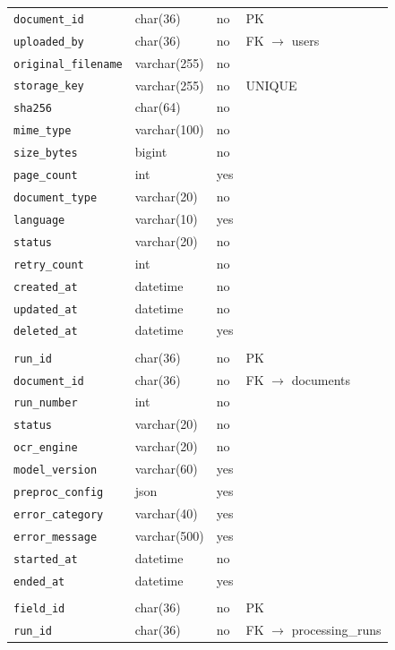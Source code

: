 \documentclass[11pt,a4paper]{report}
\begin{document}
{\begin{longtable}{L{4.2cm}L{3.4cm}L{1.1cm}L{5.0cm}}
\texttt{document\_id} & char(36) & no & PK\\
\texttt{uploaded\_by} & char(36) & no & FK $\rightarrow$ users\\
\texttt{original\_filename} & varchar(255) & no & \\
\texttt{storage\_key} & varchar(255) & no & UNIQUE\\
\texttt{sha256} & char(64) & no & \\
\texttt{mime\_type} & varchar(100) & no & \\
\texttt{size\_bytes} & bigint & no & \\
\texttt{page\_count} & int & yes & \\
\texttt{document\_type} & varchar(20) & no & \\
\texttt{language} & varchar(10) & yes & \\
\texttt{status} & varchar(20) & no & \\
\texttt{retry\_count} & int & no & \\
\texttt{created\_at} & datetime & no & \\
\texttt{updated\_at} & datetime & no & \\
\texttt{deleted\_at} & datetime & yes & \\
\\
\texttt{run\_id} & char(36) & no & PK\\
\texttt{document\_id} & char(36) & no & FK $\rightarrow$ documents\\
\texttt{run\_number} & int & no & \\
\texttt{status} & varchar(20) & no & \\
\texttt{ocr\_engine} & varchar(20) & no & \\
\texttt{model\_version} & varchar(60) & yes & \\
\texttt{preproc\_config} & json & yes & \\
\texttt{error\_category} & varchar(40) & yes & \\
\texttt{error\_message} & varchar(500) & yes & \\
\texttt{started\_at} & datetime & no & \\
\texttt{ended\_at} & datetime & yes & \\
\\
\texttt{field\_id} & char(36) & no & PK\\
\texttt{run\_id} & char(36) & no & FK $\rightarrow$ processing\_runs\\

\end{longtable}}
\end{document}
